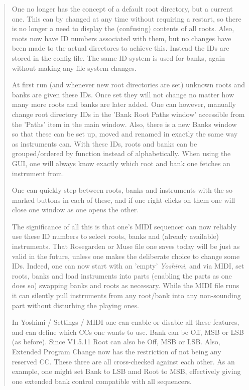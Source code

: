    \begin{quotation}
      One no longer has the concept of a default root directory, but a current
      one. This can by changed at any time without requiring a restart, so
      there is no longer a need to display the (confusing) contents of all
      roots. Also, roots now have ID numbers associated with them, but no
      changes have been made to the actual directores to achieve this. Instead
      the IDs are stored in the config file. The same ID system is used for
      banks, again without making any file system changes.

      At first run (and whenever new root directories are set) unknown roots
      and banks are given these IDs. Once set they will not change no matter
      how many more roots and banks are later added. One can however, manually
      change root directory IDs in the 'Bank Root Paths window' accessible from
      the 'Paths' item in the main window. Also, there is a new Banks window so
      that these can be set up, moved and renamed in exactly the same way as
      instruments can.  With these IDs, roots and banks can be grouped/ordered
      by function instead of alphabetically. When using the GUI, one will
      always know exactly which root and bank one fetches an instrument from.

      One can quickly step between roots, banks and instruments with the so
      marked buttons in each of these, and if one right-clicks on them one will
      close one window as one opens the other.

      The significance of all this is that one's MIDI sequencer can now
      reliably use these ID numbers to select roots, banks and (already
      available) instruments. That Rosegarden or Muse file one saves today will
      be just as valid in the future, unless one makes the deliberate choice to
      change some IDs. Indeed, one can now start with an 'empty'
      \textsl{Yoshimi}, and
      via MIDI, set roots, banks and load instruments into parts (enabling the
      parts as one does so) swapping banks and roots as necessary. While the
      MIDI file runs it can silently pull instruments from any root/bank into
      any non-sounding part without disturbing the playing ones.

      In Yoshimi / Settings / MIDI one can enable or disable all these features,
      and can define which CCs one wants to use. Bank can be Off, MSB or LSB
      (as before). Since V1.5.11 Root can also be Off, MSB or LSB.
      Also, Extended Program Change now has the restriction of not being any
      reserved CC. These three are all cross-checked against each other.
      As an example, one might set Bank to LSB amd Root to MSB, effectively
      giving one extended bank control compatible with all sequencers.


\end{quotation}
